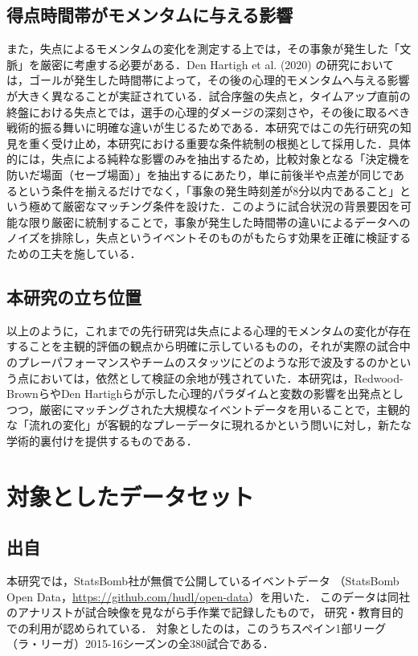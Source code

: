 \documentclass[11pt]{ujarticle} %
\begin{document}
\subsection{得点時間帯がモメンタムに与える影響}
また，失点によるモメンタムの変化を測定する上では，その事象が発生した「文脈」を厳密に考慮する必要がある．Den Hartigh et al. (2020)\cite{ref:hartigh} の研究においては，ゴールが発生した時間帯によって，その後の心理的モメンタムへ与える影響が大きく異なることが実証されている．試合序盤の失点と，タイムアップ直前の終盤における失点とでは，選手の心理的ダメージの深刻さや，その後に取るべき戦術的振る舞いに明確な違いが生じるためである．本研究ではこの先行研究の知見を重く受け止め，本研究における重要な条件統制の根拠として採用した．具体的には，失点による純粋な影響のみを抽出するため，比較対象となる「決定機を防いだ場面（セーブ場面）」を抽出するにあたり，単に前後半や点差が同じであるという条件を揃えるだけでなく，「事象の発生時刻差が8分以内であること」という極めて厳密なマッチング条件を設けた．このように試合状況の背景要因を可能な限り厳密に統制することで，事象が発生した時間帯の違いによるデータへのノイズを排除し，失点というイベントそのものがもたらす効果を正確に検証するための工夫を施している．

\subsection{本研究の立ち位置}
以上のように，これまでの先行研究は失点による心理的モメンタムの変化が存在することを主観的評価の観点から明確に示しているものの，それが実際の試合中のプレーパフォーマンスやチームのスタッツにどのような形で波及するのかという点においては，依然として検証の余地が残されていた．本研究は，Redwood-BrownらやDen Hartighらが示した心理的パラダイムと変数の影響を出発点としつつ，厳密にマッチングされた大規模なイベントデータを用いることで，主観的な「流れの変化」が客観的なプレーデータに現れるかという問いに対し，新たな学術的裏付けを提供するものである．

\section{対象としたデータセット}
\label{sec:dataset}

\subsection{出自}

本研究では，StatsBomb社が無償で公開しているイベントデータ
（StatsBomb Open Data\cite{ref:statsbomb}，\url{https://github.com/hudl/open-data}）を用いた．
このデータは同社のアナリストが試合映像を見ながら手作業で記録したもので，
研究・教育目的での利用が認められている．
対象としたのは，このうちスペイン1部リーグ（ラ・リーガ）2015-16シーズンの全380試合である．
\end{document}
